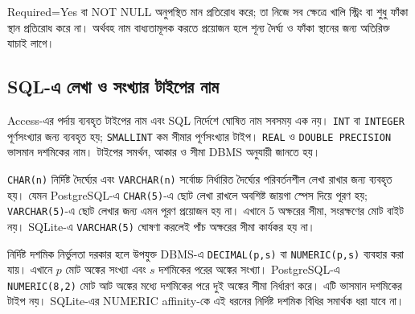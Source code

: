 Required=Yes বা NOT NULL অনুপস্থিত মান প্রতিরোধ করে; তা নিজে সব ক্ষেত্রে খালি স্ট্রিং বা শুধু ফাঁকা স্থান প্রতিরোধ করে না। অর্থবহ নাম বাধ্যতামূলক করতে প্রয়োজন হলে শূন্য দৈর্ঘ্য ও ফাঁকা স্থানের জন্য অতিরিক্ত যাচাই লাগে।

\subsection{SQL-এ লেখা ও সংখ্যার টাইপের নাম}
Access-এর পর্দায় ব্যবহৃত টাইপের নাম এবং SQL নির্দেশে ঘোষিত নাম সবসময় এক নয়। \texttt{INT} বা \texttt{INTEGER} পূর্ণসংখ্যার জন্য ব্যবহৃত হয়; \texttt{SMALLINT} কম সীমার পূর্ণসংখ্যার টাইপ। \texttt{REAL} ও \texttt{DOUBLE PRECISION} ভাসমান দশমিকের নাম। টাইপের সমর্থন, আকার ও সীমা DBMS অনুযায়ী জানতে হয়।

\texttt{CHAR(n)} নির্দিষ্ট দৈর্ঘ্যের এবং \texttt{VARCHAR(n)} সর্বোচ্চ নির্ধারিত দৈর্ঘ্যের পরিবর্তনশীল লেখা রাখার জন্য ব্যবহৃত হয়। যেমন PostgreSQL-এ \texttt{CHAR(5)}-এ ছোট লেখা রাখলে অবশিষ্ট জায়গা স্পেস দিয়ে পূরণ হয়; \texttt{VARCHAR(5)}-এ ছোট লেখার জন্য এমন পূরণ প্রয়োজন হয় না। এখানে 5 অক্ষরের সীমা, সংরক্ষণের মোট বাইট নয়। SQLite-এ \texttt{VARCHAR(5)} ঘোষণা করলেই পাঁচ অক্ষরের সীমা কার্যকর হয় না।

নির্দিষ্ট দশমিক নির্ভুলতা দরকার হলে উপযুক্ত DBMS-এ \texttt{DECIMAL(p,s)} বা \texttt{NUMERIC(p,s)} ব্যবহার করা যায়। এখানে $p$ মোট অঙ্কের সংখ্যা এবং $s$ দশমিকের পরের অঙ্কের সংখ্যা। PostgreSQL-এ \texttt{NUMERIC(8,2)} মোট আট অঙ্কের মধ্যে দশমিকের পরে দুই অঙ্কের সীমা নির্ধারণ করে। এটি ভাসমান দশমিকের টাইপ নয়। SQLite-এর NUMERIC affinity-কে এই ধরনের নির্দিষ্ট দশমিক বিধির সমার্থক ধরা যাবে না।

